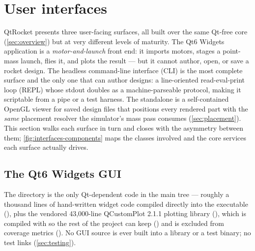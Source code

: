 \section{User interfaces}\label{sec:interfaces}

QtRocket presents three user-facing surfaces, all built over the same Qt-free core
(\cref{sec:overview}) but at very different levels of maturity. The Qt6 Widgets application
 is a \emph{motor-and-launch} front end: it imports motors, stages a point-mass
launch, flies it, and plots the result --- but it cannot author, open, or save a rocket design.
The headless command-line interface (CLI)  is the most complete surface and
the only one that can author designs: a line-oriented read-eval-print loop (REPL) whose
stdout doubles as a machine-parseable protocol, making it scriptable from a pipe or a test
harness. The standalone  is a self-contained OpenGL viewer for saved
 design files that positions every rendered part with the \emph{same} placement
resolver the simulator's mass pass consumes (\cref{sec:placement}). This section walks each
surface in turn and closes with the asymmetry between them;
\cref{fig:interfaces-components} maps the classes involved and the core services each
surface actually drives.


\subsection{The Qt6 Widgets GUI}\label{sec:interfaces-gui}

The  directory is the only Qt-dependent code in the main tree --- roughly a
thousand lines of hand-written widget code compiled directly into the 
executable (), plus the vendored 43{,}000-line QCustomPlot 2.1.1
plotting library (), which is compiled with  so the rest
of the project can keep  () and is excluded from
coverage metrics (). No GUI source is ever built into a library or a
test binary; no test links  (\cref{sec:testing}).

